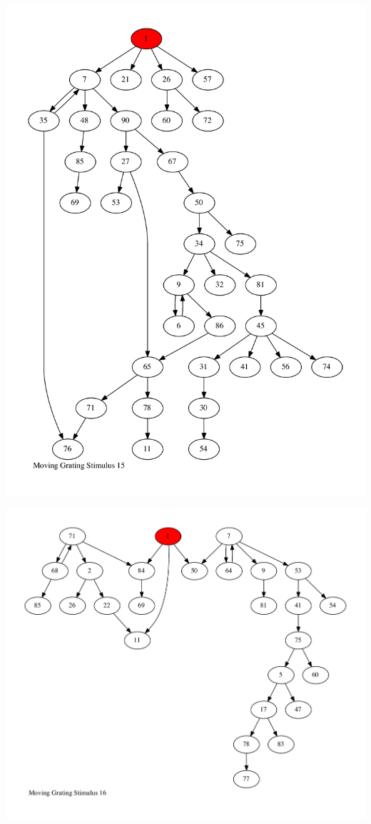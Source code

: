 \documentclass{article}
\begin{document}
\newpage
\includegraphics[max height=\textheight,max width=\textwidth]{stim_mov_grat/stim15_pp.pdf}

\newpage
\includegraphics[max height=\textheight,max width=\textwidth]{stim_mov_grat/stim16_pp.pdf}
\end{document}
